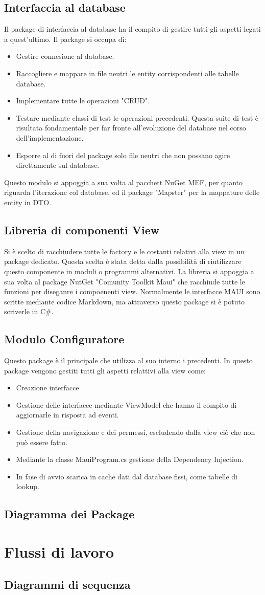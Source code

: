 \subsection{Interfaccia al database}
Il package di interfaccia al database ha il compito di gestire tutti gli aspetti legati a quest'ultimo.
Il package si occupa di:
\begin{itemize}
    \item Gestire connesione al database.
    \item Raccogliere e mappare in file neutri le entity corrispondenti alle tabelle database.
    \item Implementare tutte le operazioni "CRUD".
    \item Testare mediante classi di test le operazioni precedenti.
    Questa suite di test è risultata fondamentale per far fronte all'evoluzione del database nel corso dell'implementazione.
    \item Esporre al di fuori del package solo file neutri che non possano agire direttamente sul database.
\end{itemize}
Questo modulo si appoggia a sua volta al pacchett NuGet \ac{MEF}\cite{MEF}, per quanto riguarda l'iterazione col database,
ed il package "Mapster"\cite{Mapster} per la mappature delle entity in \ac{DTO}.
\subsection{Libreria di componenti View}
Si è scelto di racchiudere tutte le factory e le costanti relativi alla view in un package dedicato.
Questa scelta è stata detta dalla possibilità di riutilizzare questo componente in moduli o programmi alternativi.
La libreria si appoggia a sua volta al package NutGet "Comunity Toolkit Maui"  che racchiude tutte le funzioni per diseganre i compoenenti view.
Normalmente le interfacce MAUI sono scritte mediante codice Markdown, ma attraverso questo package si è potuto scriverle in C#.
\subsection{Modulo Configuratore}
Questo package è il principale che utilizza al suo interno i precedenti.
In questo package vengono gestiti tutti gli aspetti relattivi alla view come:
\begin{itemize}
    \item Creazione interfacce
    \item Gestione delle interfacce mediante ViewModel che hanno il compito di aggiornarle in risposta ad eventi.
    \item Gestione della navigazione e dei permessi, escludendo dalla view ciò che non può essere fatto.
    \item Mediante la classe MauiProgram.cs gestione della Dependency Injection.
    \item In fase di avvio scarica in cache dati dal database fissi, come tabelle di lookup.
\end{itemize}
\subsection{Diagramma dei Package}
\section{Flussi di lavoro}
\subsection{Diagrammi di sequenza}